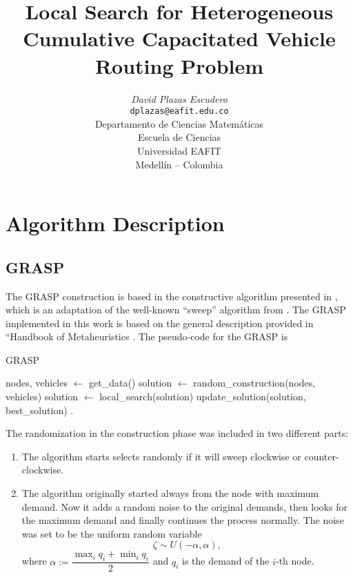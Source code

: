 \documentclass[10pt,twoside]{article}
\title{Local Search for Heterogeneous Cumulative Capacitated Vehicle Routing Problem}
\author{\emph{David Plazas Escudero}\\
\vspace{0.3cm}
\small{\tt{dplazas@eafit.edu.co}}\\
Departamento de Ciencias Matemáticas\\
Escuela de Ciencias\\
Universidad EAFIT\\
Medellín -- Colombia}
\date{}
\begin{document}
\maketitle

\thispagestyle{firststyle}


\section{Algorithm Description}\label{sec_intro}
\subsection{GRASP}
The GRASP construction is based in the constructive algorithm presented in \cite{constr}, which is an adaptation of the well-known ``sweep'' algorithm from \cite{gillett1974heuristic}. The GRASP implemented in this work is based on the general description provided in ``Handbook of Metaheuristics \cite[Ch. 8]{glover2006handbook}. The pseudo-code for the GRASP is

\begin{algorithm}[H]
  \caption{GRASP} \label{cod:grasp}
  \begin{algorithmic}[1]
        \State nodes, vehicles $\gets$ get\_data()
        \State solution $\gets$ random\_construction(nodes, vehicles)
        \State solution $\gets$ local\_search(solution)
        \State update\_solution(solution, best\_solution)
        \EndFor
    \EndProcedure.
  \end{algorithmic}
\end{algorithm}


The randomization in the construction phase was included in two different parts:
\begin{enumerate}
    \item The algorithm starts selects randomly if it will sweep clockwise or counter-clockwise.
    \item The algorithm originally started always from the node with maximum demand. Now it adds a random noise to the original demands, then looks for the maximum demand and finally continues the process normally. The noise was set to be the uniform random variable \begin{equation}\label{eq:unif}
        \zeta\sim U(-\alpha,\alpha),
    \end{equation}
    where $\alpha:=\dfrac{\max_iq_i + \min_i q_i}{2}$ and $q_i$ is the demand of the $i$-th node.
\end{enumerate}
\end{document}
